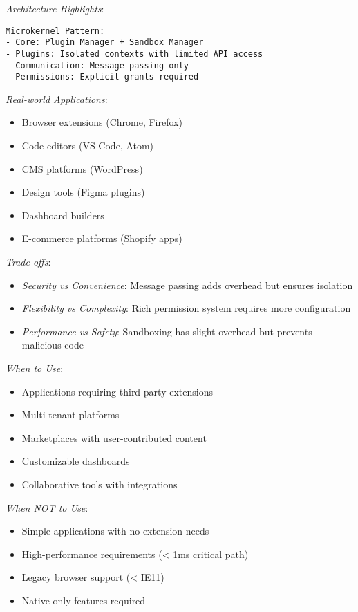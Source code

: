\documentclass[11pt]{article}
\begin{document}
\emph{Architecture Highlights}:

\begin{verbatim}
Microkernel Pattern:
- Core: Plugin Manager + Sandbox Manager
- Plugins: Isolated contexts with limited API access
- Communication: Message passing only
- Permissions: Explicit grants required
\end{verbatim}

\emph{Real-world Applications}:

\begin{itemize}
\item Browser extensions (Chrome, Firefox)
\item Code editors (VS Code, Atom)
\item CMS platforms (WordPress)
\item Design tools (Figma plugins)
\item Dashboard builders
\item E-commerce platforms (Shopify apps)
\end{itemize}

\emph{Trade-offs}:

\begin{itemize}
\item \emph{Security vs Convenience}: Message passing adds overhead but ensures isolation
\item \emph{Flexibility vs Complexity}: Rich permission system requires more configuration
\item \emph{Performance vs Safety}: Sandboxing has slight overhead but prevents malicious code
\end{itemize}

\emph{When to Use}:

\begin{itemize}
\item Applications requiring third-party extensions
\item Multi-tenant platforms
\item Marketplaces with user-contributed content
\item Customizable dashboards
\item Collaborative tools with integrations
\end{itemize}

\emph{When NOT to Use}:

\begin{itemize}
\item Simple applications with no extension needs
\item High-performance requirements (< 1ms critical path)
\item Legacy browser support (< IE11)
\item Native-only features required
\end{itemize}
\end{document}
